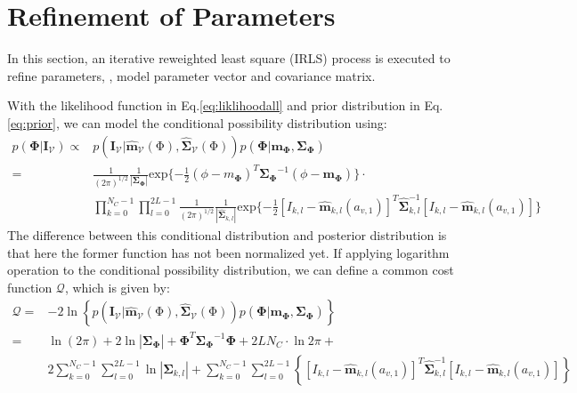 \section{Refinement of  Parameters}
\label{sec:ref}
In this section, an iterative reweighted least square (IRLS) process is executed to refine parameters,
, model parameter vector and covariance matrix.

With the likelihood function in Eq.\ref{eq:liklihoodall} and prior distribution in
Eq.\ref{eq:prior}, we can model the conditional possibility distribution using:
\begin{align}
\label{eq:costf}
    p(\mathbf{\Phi}|\mathbf{\mathbf{I}}_{\mathcal{V}}) 
    \propto &
    p(\mathbf{\mathbf{I}_{\mathcal{V}}}
    |\hat{\mathbf{\mathbf{m}}}_{\mathcal{V}}(\mathrm{\Phi}),\hat{\mathbf{\mathbf{\Sigma}}}_{\mathcal{V}}(\mathrm{\Phi}))p(\mathbf{\Phi}
    | \mathbf{m}_{\mathbf{\Phi}},
    \mathbf{\mathbf{\Sigma}}_{\mathbf{\Phi}})\nonumber\\
    = & {\frac{1}{{(2\pi)}^{1/2}}}
      \frac{1}{|\mathbf{\Sigma}_{\mathbf{\Phi}}|}
      \mathrm{exp}\{-\frac{1}{2}{(\phi-m_{\mathbf{\Phi}})^T{\mathbf{\Sigma}_{\mathbf{\Phi}}}^{-1}(\phi-\mathbf{m}_{\mathbf{\Phi}})}\}\cdot
    \nonumber\\ 
    & \prod_{k = 0}^{N_{C}-1} \prod_{l=0}^{2L-1}{\frac{1}{(2\pi)^{1/2}}
        \frac{1}{|\hat{\mathbf{\Sigma}}_{k,l}|} \mathrm{exp}\{-\frac{1}{2}
        {\left[I_{k,l}-\hat{\mathbf{m}}_{k,l}(a_{v,1})\right]^T\hat{\mathbf{\Sigma}}_{k,l}^{-1}\left[I_{k,l}-\hat{\mathbf{m}}_{k,l}(a_{v,1})\right]}
      }\}
\end{align}
The difference between this conditional distribution and posterior
distribution is that here the former function has not been normalized yet.
If applying logarithm operation to the conditional possibility
distribution, we can define a common cost function $\mathcal{Q}$,
which is given by:
\begin{align}
  \label{eq:costd}
  \mathcal{Q} = & -2 \ln \left\{  p(\mathbf{\mathbf{I}_{\mathcal{V}}}
    |\hat{\mathbf{\mathbf{m}}}_{\mathcal{V}}(\mathrm{\Phi}),\hat{\mathbf{\mathbf{\Sigma}}}_{\mathcal{V}}(\mathrm{\Phi}))p(\mathbf{\Phi}
    | \mathbf{m}_{\mathbf{\Phi}},
    \mathbf{\mathbf{\Sigma}}_{\mathbf{\Phi}})\right\}\nonumber\\
 = & \ln{(2\pi)} + 2\ln{|\mathbf{\Sigma}_{\mathbf{\Phi}}|} +
 {\mathbf{\Phi}}^T{\mathbf{\Sigma}_{\mathbf{\Phi}}}^{-1}\mathbf{\Phi}
 + 2LN_{C} \cdot \ln{2\pi} + \nonumber \\
& 2\sum_{k = 0}^{N_{C}-1} \sum_{l=0}^{2L-1}{\ln{|\mathbf{\Sigma}_{k,l}|}} + \sum_{k = 0}^{N_{C}-1} \sum_{l=0}^{2L-1}
\left\{{\left[I_{k,l}-\hat{\mathbf{m}}_{k,l}(a_{v,1})\right]^T\hat{\mathbf{\Sigma}}_{k,l}^{-1}\left[I_{k,l}-\hat{\mathbf{m}}_{k,l}(a_{v,1})\right]}\right\}
\end{align}

